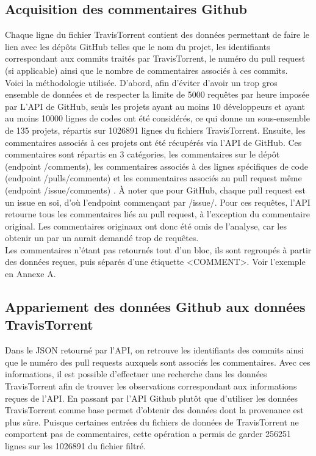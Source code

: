 \documentclass[10pt, conference]{IEEEtran}
\begin{document}
\subsection{Acquisition des commentaires Github}
Chaque ligne du fichier TravisTorrent contient des données permettant de faire le lien avec les dépôts GitHub telles que le nom du projet, les identifiants correspondant aux commits traités par TravisTorrent, le numéro du pull request (si applicable) ainsi que le nombre de commentaires associés à ces commits. \\
Voici la méthodologie utilisée. D'abord, afin d'éviter d'avoir un trop gros ensemble de données et de respecter la limite de 5000 requêtes par heure imposée par L'API de GitHub, seuls les projets ayant au moins 10 développeurs et ayant au moins 10000 lignes de codes ont été considérés, ce qui donne un sous-ensemble de 135 projets, répartis sur 1026891 lignes du fichiers TravisTorrent. Ensuite, les commentaires associés à ces projets ont été récupérés via l'API de GitHub. Ces commentaires sont répartis en 3 catégories, les commentaires sur le dépôt (endpoint /comments), les commentaires associés à des lignes spécifiques de code (endpoint /pulls/comments) et les commentaires associés au pull request même (endpoint /issue/comments) \cite{c4}. À noter que pour GitHub, chaque pull request est un issue en soi, d'où l'endpoint commençant par /issue/. Pour ces requêtes, l’API retourne tous les commentaires liés au pull request, à l’exception du commentaire original. Les commentaires originaux ont donc été omis de l’analyse, car les obtenir un par un aurait demandé trop de requêtes. \\
Les commentaires n’étant pas retournés tout d’un bloc, ils sont regroupés à partir des données reçues, puis séparés d’une étiquette \textless COMMENT\textgreater. Voir l’exemple en Annexe A.

\subsection{Appariement des données Github aux données TravisTorrent}
Dans le JSON retourné par l'API, on retrouve les identifiants des commits ainsi que le numéro des pull requests auxquels sont associés les commentaires. Avec ces informations, il est possible d’effectuer une recherche dans les données TravisTorrent afin de trouver les observations  correspondant aux informations reçues de l'API. En passant par l’API Github plutôt que d’utiliser les données TravisTorrent comme base permet d’obtenir des données dont la provenance est plus sûre. Puisque certaines entrées du fichiers de données de TravisTorrent ne comportent pas de commentaires, cette opération a permis de garder 256251 lignes sur les 1026891 du fichier filtré. 
\end{document}
